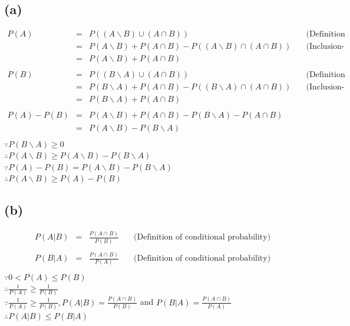 \documentclass{article} %
\begin{document}
\subsection*{(a)}
\[\begin{array}{rlll}
    P(A)    &=& P((A\backslash B) \cup (A \cap B)) &\quad\mbox{(Definition of /)}\\
            &=& P(A\backslash B) + P(A \cap B) - P((A \backslash B) \cap (A \cap B))   &\quad\mbox{(Inclusion-exclusion rule)}\\
            &=& P(A\backslash B) + P(A \cap B)\\
            \\
    P(B)    &=& P((B \backslash A) \cup (A \cap B))         &\quad\mbox{(Definition of /)}\\
            &=& P(B \backslash A) + P(A \cap B) - P((B \backslash A) \cap (A \cap B)) &\quad\mbox{(Inclusion-exclusion rule)}\\
            &=& P(B \backslash A) + P(A \cap B)\\
            \\
    P(A) - P(B) &=& P(A \backslash B) + P(A \cap B) - P(B\backslash A) - P(A \cap B)\\
                &=& P(A \backslash B) - P(B \backslash A)\\
\end{array}\]
$\because P(B \backslash A) \geq 0$\\
$\therefore P(A \backslash B) \geq P(A \backslash B) - P(B \backslash A)$\\
$\because P(A) - P(B) = P(A \backslash B) - P(B \backslash A)$\\
$\therefore P(A\backslash B) \geq P(A) - P(B)$
\subsection*{(b)}
\[\begin{array}{rlll}
    P(A|B) &=& \frac{P(A \cap B)}{P(B)} &\quad\mbox{(Definition of conditional probability)}\\
    \\
    P(B|A) &=& \frac{P(A \cap B)}{P(A)} &\quad\mbox{(Definition of conditional probability)}\\
\end{array}\]
$\because 0<P(A)\leq P(B)$\\
$\therefore \frac{1}{P(A)} \geq \frac{1}{P(B)}$\\
$\because \frac{1}{P(A)} \geq \frac{1}{P(B)}, P(A|B) = \frac{P(A \cap B)}{P(B)}$ and $P(B|A) = \frac{P(A \cap B)}{P(A)}$\\
$\therefore P(A|B) \leq P(B|A)$
\end{document}

